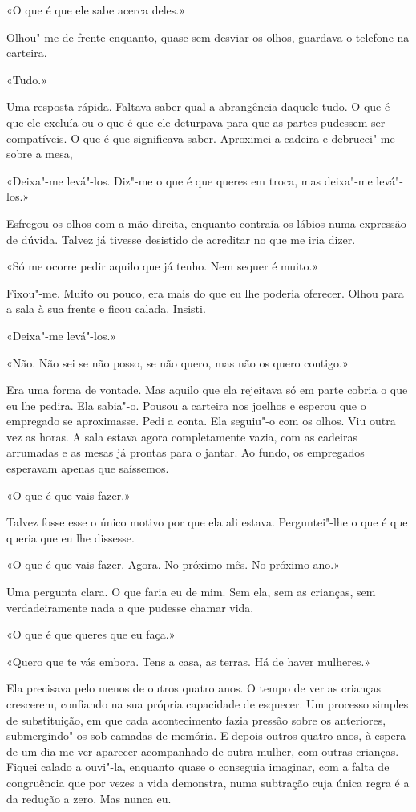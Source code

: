 «O que é que ele sabe acerca deles.»

Olhou"-me de frente enquanto, quase sem desviar os olhos, guardava o
telefone na carteira.

«Tudo.»

Uma resposta rápida. Faltava saber qual a abrangência daquele tudo. O
que é que ele excluía ou o que é que ele deturpava para que as partes
pudessem ser compatíveis. O que é que significava saber. Aproximei a
cadeira e debrucei"-me sobre a mesa,

«Deixa"-me levá"-los. Diz"-me o que é que queres em troca, mas deixa"-me
levá"-los.»

Esfregou os olhos com a mão direita, enquanto contraía os lábios numa
expressão de dúvida. Talvez já tivesse desistido de acreditar no que me
iria dizer.

«Só me ocorre pedir aquilo que já tenho. Nem sequer é muito.»

Fixou"-me. Muito ou pouco, era mais do que eu lhe poderia oferecer.
Olhou para a sala à sua frente e ficou calada. Insisti.

«Deixa"-me levá"-los.»

«Não. Não sei se não posso, se não quero, mas não os quero contigo.»

Era uma forma de vontade. Mas aquilo que ela rejeitava só em parte
cobria o que eu lhe pedira. Ela sabia"-o. Pousou a carteira nos joelhos
e esperou que o empregado se aproximasse. Pedi a conta. Ela seguiu"-o
com os olhos. Viu outra vez as horas. A sala estava agora completamente
vazia, com as cadeiras arrumadas e as mesas já prontas para o jantar. Ao
fundo, os empregados esperavam apenas que saíssemos.

«O que é que vais fazer.»

Talvez fosse esse o único motivo por que ela ali estava. Perguntei"-lhe
o que é que queria que eu lhe dissesse.

«O que é que vais fazer. Agora. No próximo mês. No próximo ano.»

Uma pergunta clara. O que faria eu de mim. Sem ela, sem as crianças, sem
verdadeiramente nada a que pudesse chamar vida.

«O que é que queres que eu faça.»

«Quero que te vás embora. Tens a casa, as terras. Há de haver
mulheres.»

Ela precisava pelo menos de outros quatro anos. O tempo de ver as
crianças crescerem, confiando na sua própria capacidade de esquecer. Um
processo simples de substituição, em que cada acontecimento fazia
pressão sobre os anteriores, submergindo"-os sob camadas de memória. E
depois outros quatro anos, à espera de um dia me ver aparecer
acompanhado de outra mulher, com outras crianças. Fiquei calado a
ouvi"-la, enquanto quase o conseguia imaginar, com a falta de
congruência que por vezes a vida demonstra, numa subtração cuja única
regra é a da redução a zero. Mas nunca eu.

